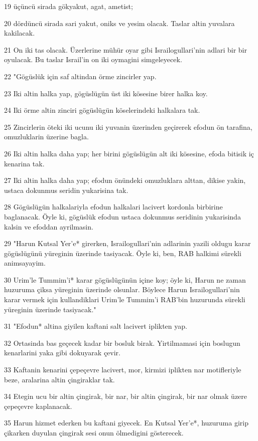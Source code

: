 \par 19 üçüncü sirada gökyakut, agat, ametist;
\par 20 dördüncü sirada sari yakut, oniks ve yesim olacak. Taslar altin yuvalara kakilacak.
\par 21 On iki tas olacak. Üzerlerine mühür oyar gibi Israilogullari'nin adlari bir bir oyulacak. Bu taslar Israil'in on iki oymagini simgeleyecek.
\par 22 "Gögüslük için saf altindan örme zincirler yap.
\par 23 Iki altin halka yap, gögüslügün üst iki kösesine birer halka koy.
\par 24 Iki örme altin zinciri gögüslügün köselerindeki halkalara tak.
\par 25 Zincirlerin öteki iki ucunu iki yuvanin üzerinden geçirerek efodun ön tarafina, omuzluklarin üzerine bagla.
\par 26 Iki altin halka daha yap; her birini gögüslügün alt iki kösesine, efoda bitisik iç kenarina tak.
\par 27 Iki altin halka daha yap; efodun önündeki omuzluklara alttan, dikise yakin, ustaca dokunmus seridin yukarisina tak.
\par 28 Gögüslügün halkalariyla efodun halkalari lacivert kordonla birbirine baglanacak. Öyle ki, gögüslük efodun ustaca dokunmus seridinin yukarisinda kalsin ve efoddan ayrilmasin.
\par 29 "Harun Kutsal Yer'e* girerken, Israilogullari'nin adlarinin yazili oldugu karar gögüslügünü yüreginin üzerinde tasiyacak. Öyle ki, ben, RAB halkimi sürekli animsayayim.
\par 30 Urim'le Tummim'i* karar gögüslügünün içine koy; öyle ki, Harun ne zaman huzuruma çiksa yüreginin üzerinde olsunlar. Böylece Harun Israilogullari'nin karar vermek için kullandiklari Urim'le Tummim'i RAB'bin huzurunda sürekli yüreginin üzerinde tasiyacak."
\par 31 "Efodun* altina giyilen kaftani salt lacivert iplikten yap.
\par 32 Ortasinda bas geçecek kadar bir bosluk birak. Yirtilmamasi için boslugun kenarlarini yaka gibi dokuyarak çevir.
\par 33 Kaftanin kenarini çepeçevre lacivert, mor, kirmizi iplikten nar motifleriyle beze, aralarina altin çingiraklar tak.
\par 34 Etegin ucu bir altin çingirak, bir nar, bir altin çingirak, bir nar olmak üzere çepeçevre kaplanacak.
\par 35 Harun hizmet ederken bu kaftani giyecek. En Kutsal Yer'e*, huzuruma girip çikarken duyulan çingirak sesi onun ölmedigini gösterecek.

